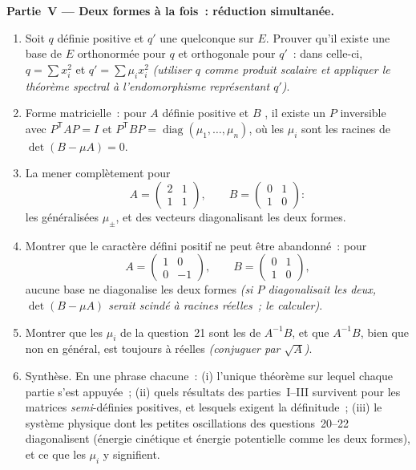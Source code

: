 \begin{problem}
\medskip
\noindent\textbf{Partie~V --- Deux formes à la fois~: réduction
simultanée.}
\begin{enumerate}[resume]
  \item Soit $q$ définie positive et $q'$ une 
        quelconque sur $E$. Prouver qu'il existe une base de
        $E$ orthonormée pour $q$ et orthogonale pour $q'$~: dans
        celle-ci, $q = \sum x_i^2$ et $q' = \sum \mu_i x_i^2$
        \emph{(utiliser $q$ comme produit scalaire et appliquer le
        théorème spectral à l'endomorphisme représentant $q'$)}.
  \item Forme matricielle~: pour $A$ définie positive et $B$
        , il existe un $P$ inversible avec
        $P^{\mathsf T}AP = I$ et $P^{\mathsf T}BP =
        \operatorname{diag}(\mu_1, \dots, \mu_n)$, où les
        $\mu_i$ sont les racines de $\det(B - \mu A) = 0$.
  \item La mener complètement pour
        \[
        A = \begin{pmatrix} 2 & 1\\ 1 & 1 \end{pmatrix},
        \qquad
        B = \begin{pmatrix} 0 & 1\\ 1 & 0 \end{pmatrix} :
        \]
        les  généralisées $\mu_\pm$, et des vecteurs
        diagonalisant les deux formes.
  \item Montrer que le caractère défini positif ne peut être
        abandonné~: pour
        \[
        A = \begin{pmatrix} 1 & 0\\ 0 & -1 \end{pmatrix},
        \qquad
        B = \begin{pmatrix} 0 & 1\\ 1 & 0 \end{pmatrix},
        \]
        aucune base ne diagonalise les deux formes \emph{(si $P$
        diagonalisait les deux, $\det(B - \mu A)$ serait scindé à
        racines réelles~; le calculer)}.
  \item Montrer que les $\mu_i$ de la question~21 sont les
         de $A^{-1}B$, et que $A^{-1}B$, bien que
        non  en général, est toujours  à
         réelles \emph{(conjuguer par $\sqrt A$)}.
  \item Synthèse. En une phrase chacune~: (i) l'unique théorème
        sur lequel chaque partie s'est appuyée~; (ii) quels
        résultats des parties~I--III survivent pour les matrices
        \emph{semi}-définies positives, et lesquels exigent la
        définitude~; (iii) le système physique dont les petites
        oscillations des questions~20--22 diagonalisent (énergie
        cinétique et énergie potentielle comme les deux formes),
        et ce que les $\mu_i$ y signifient.
\end{enumerate}
\end{problem}
